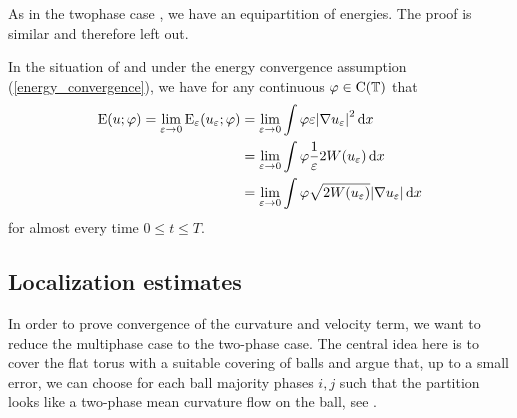 As in the twophase case , we have an 
equipartition of energies. The proof is similar and therefore left out.

\begin{lemma}
	\label{equipartition_of_energies_multiphase}
	In the situation of  and under 
	the energy convergence assumption (\ref{energy_convergence}), we have for 
	any continuous $ \varphi \in \operatorname{C} ( \operatorname{\mathbb{T}} ) $ that
	\begin{align*}
		\operatorname{E} ( u ; \varphi )
		=
		\lim_{ \varepsilon \to 0 }
		\operatorname{E}_{ \varepsilon } ( u_{ \varepsilon } ; \varphi )
		& =
		\lim_{ \varepsilon \to 0 }
		\int
		\varphi
		\varepsilon
		\abs{ \nabla u_{ \varepsilon } }^{ 2 }
		\dd{ x }
		\\
		& =
		\lim_{ \varepsilon \to 0 }
		\int
		\varphi
		\frac{ 1 }{ \varepsilon } 2 W ( u_{ \varepsilon } )
		\dd{ x }
		\\
		& =
		\lim_{ \varepsilon \to 0 }
		\int
		\varphi
		\sqrt{ 2 W ( u_{ \varepsilon } ) }
		\abs{ \nabla u_{ \varepsilon } }
		\dd{ x }
	\end{align*}
	for almost every time $ 0 \leq t \leq T $.
\end{lemma}

\subsection{Localization estimates}
\label{section_localization_estimates}
In order to prove convergence of the curvature and velocity term, we want to 
reduce the multiphase case to the two-phase case. The central idea here is to 
cover the flat torus with a suitable covering of balls and argue that, up to a 
small error, we can choose 
for each ball majority phases $ i, j $ such that the partition looks like a 
two-phase mean curvature flow on the ball, see 
.

